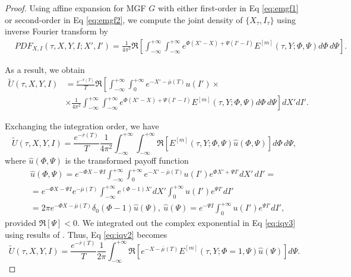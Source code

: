 \documentclass[pdftex,11pt,a4paper] {article}
\begin{document}
\begin{proof}
Using affine expansion for MGF $G$  with either first-order in Eq \eqref{eq:emgf1} or second-order in Eq \eqref{eq:emgf2}, we compute the joint density of $\{X_\tau, I_\tau\}$ using inverse Fourier transform by
\begin{equation*}
\begin{split}
&PDF_{X,I}(\tau, X, Y,I;X',I')=\frac{1}{4\pi^2}\Re\left[\int_{-\infty}^{+\infty}\int_{-\infty}^{+\infty}e^{\Phi (X'-X)+\Psi (I'-I)}E^{[m]}(\tau,Y;\Phi,\Psi)d\Phi\,d\Psi\right].
\end{split}
\end{equation*}

As a result, we obtain
\begin{equation*}
\begin{split}
\tilde{U}(\tau, X, Y, I)&=\frac{e^{-\bar{r}(T)}}{T}\Re\left[
\int_{-\infty}^{+\infty}\int_0^{+\infty}e^{-X'-\bar{\mu}(T)}u(I')\times\right.\\
&\left. \times
\frac{1}{4\pi^2}\int_{-\infty}^{+\infty}\int_{-\infty}^{+\infty}e^{\Phi (X'-X)+\Psi (I'-I)}E^{[m]}(\tau,Y;\Phi,\Psi)d\Phi\,d\Psi\right]dX'dI'.
\end{split}
\end{equation*}

Exchanging the integration order, we have
\begin{equation}\label{eq:iqv2}
\tilde{U}(\tau, X, Y, I)=\frac{e^{-\bar{r}(T)}}{T}\frac{1}{4\pi^2}\int_{-\infty}^{+\infty}\int_{-\infty}^{+\infty}\Re\left[E^{[m]}(\tau,Y;\Phi,\Psi)\hat{u}(\Phi,\Psi)\right]d\Phi\,d\Psi,
\end{equation}
where $\hat{u}(\Phi,\Psi)$ is the transformed payoff function
\begin{equation}\label{eq:iqv3}
\begin{split}
&\hat{u}(\Phi,\Psi)=e^{-\Phi X-\Psi I}\int_{-\infty}^{+\infty}\int_0^{+\infty}e^{-X'-\bar{\mu}(T)}u(I')e^{\Phi X'+\Psi I'}dX'\,dI'=\\
&=e^{-\Phi X-\Psi I}e^{-\bar{\mu}(T)}\int_{-\infty}^{+\infty}e^{(\Phi-1)X'}dX'\int_0^{+\infty}u(I')e^{\Psi I'}dI'\\
& =2\pi e^{-\Phi X-\bar{\mu}(T)}\delta_0(\Phi-1)\hat{u}(\Psi), \ \hat{u}(\Psi)=e^{-\Psi I}\int_0^{+\infty}u(I')e^{\Psi I'}dI',
\end{split}
\end{equation}
provided $\Re[\Psi]<0$. We integrated out the complex exponential in Eq \eqref{eq:iqv3} using results of \cite{Sepp2007}. 
Thus, Eq \eqref{eq:iqv2} becomes
\begin{equation}
\tilde{U}(\tau, X, Y, I)=\frac{e^{-\bar{r}(T)}}{T}\frac{1}{2\pi}\int_{-\infty}^{+\infty}\Re\left[e^{-X-\bar{\mu}(T)}E^{[m]}(\tau,Y;\Phi=1,\Psi)\hat{u}(\Psi)\right]d\Psi. 
\end{equation}
\end{proof}
\end{document}
